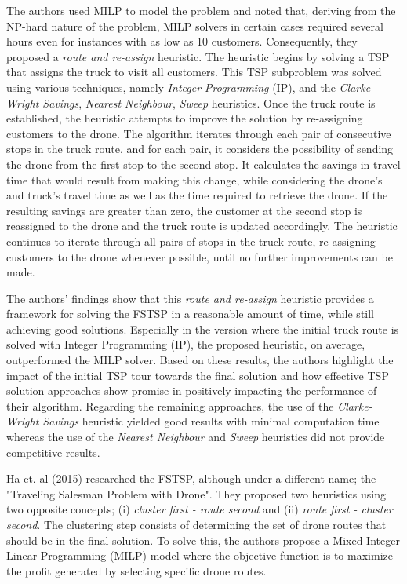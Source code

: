 \documentclass{article}
\begin{document}
	The authors used MILP to model the problem and noted that, deriving from the NP-hard nature of the problem, MILP solvers in certain cases required several hours even for instances with as low as 10 customers. Consequently, they proposed a \textit{route and re-assign} heuristic. The heuristic begins by solving a TSP that assigns the truck to visit all customers. This TSP subproblem was solved using various techniques, namely \textit{Integer Programming} (IP), and the  \textit{Clarke-Wright Savings}, \textit{Nearest Neighbour}, \textit{Sweep} heuristics. Once the truck route is established, the heuristic attempts to improve the solution by re-assigning customers to the drone. The algorithm iterates through each pair of consecutive stops in the truck route, and for each pair, it considers the possibility of sending the drone from the first stop to the second stop. It calculates the savings in travel time that would result from making this change, while considering the drone's and truck's travel time as well as the time required to retrieve the drone. If the resulting savings are greater than zero, the customer at the second stop is reassigned to the drone and the truck route is updated accordingly. The heuristic continues to iterate through all pairs of stops in the truck route, re-assigning customers to the drone whenever possible, until no further improvements can be made. 
	\par 
	The authors' findings show that this \textit{route and re-assign} heuristic provides a framework for solving the FSTSP in a reasonable amount of time, while still achieving good solutions. Especially in the version where the initial truck route is solved with Integer Programming (IP), the proposed heuristic, on average, outperformed the MILP solver. Based on these results, the authors highlight the impact of the initial TSP tour towards the final solution and how effective TSP solution approaches show promise in positively impacting the performance of their algorithm. Regarding the remaining approaches, the use of the \textit{Clarke-Wright Savings} heuristic yielded good results with minimal computation time whereas the use of the \textit{Nearest Neighbour} and \textit{Sweep} heuristics did not provide competitive results.
	\par
	Ha et. al (2015) \cite{Ha2015} researched the FSTSP, although under a different name; the "Traveling Salesman Problem with Drone". They proposed two heuristics using two opposite concepts; (i) \textit{cluster first - route second} and (ii) \textit{route first - cluster second}. The clustering step consists of determining the set of drone routes that should be in the final solution. To solve this, the authors propose a Mixed Integer Linear Programming (MILP) model where the objective function is to maximize the profit generated by selecting specific drone routes. 
\end{document}
